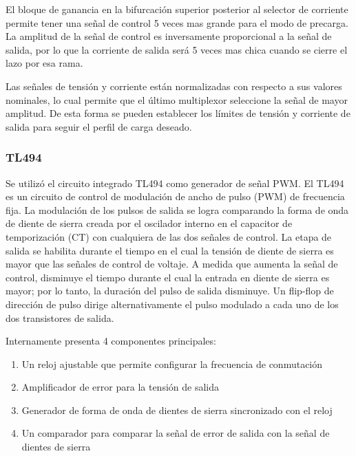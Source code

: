 El bloque de ganancia en la bifurcación superior posterior al selector de corriente permite tener una señal de control 5 veces mas grande para el modo de precarga.
La amplitud de la señal de control es inversamente proporcional a la señal de salida,
por lo que la corriente de salida será 5 veces mas chica cuando se cierre el lazo por esa rama.

Las señales de tensión y corriente están normalizadas con respecto a sus valores nominales, lo cual permite que el último multiplexor seleccione la señal de mayor amplitud. De esta forma se pueden establecer los límites de tensión y corriente de salida para seguir el perfil de carga deseado.

\subsubsection{TL494}

Se utilizó el circuito integrado TL494 como generador de señal PWM.
El TL494 es un circuito de control de modulación de ancho de pulso (PWM) de frecuencia fija. 
La modulación de los pulsos de salida se logra comparando la forma de onda de diente de sierra creada por el oscilador interno en el capacitor de temporización (CT) con cualquiera de las dos señales de control. 
La etapa de salida se habilita durante el tiempo en el cual la tensión de diente de sierra es mayor que las señales de control de voltaje. 
A medida que aumenta la señal de control, disminuye el tiempo durante el cual la entrada en diente de sierra es mayor; por lo tanto, la duración del pulso de salida disminuye. 
Un flip-flop de dirección de pulso dirige alternativamente el pulso modulado a cada uno de los dos transistores de salida.

Internamente presenta 4 componentes principales:
\begin{enumerate}
    \item Un reloj ajustable que permite configurar la frecuencia de conmutación
    \item Amplificador de error para la tensión de salida
    \item Generador de forma de onda de dientes de sierra sincronizado con el reloj
    \item Un comparador para comparar la señal de error de salida con la señal de dientes de sierra
\end{enumerate}

